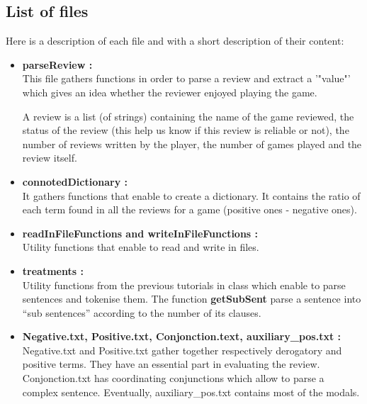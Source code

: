 \documentclass[paper=a4,fontsize=12pt]{report}
\begin{document}
\subsection{List of files}
	Here is a description of each file and with a short description of their content:
\begin{itemize}
	\item \textbf{parseReview :} \\
This file gathers functions in order to parse a review and extract a '"value"' which gives an idea whether the reviewer enjoyed playing the game.

A review is a list (of strings) containing  the name of the game reviewed, the status of the review (this help us know if this review is reliable or not), the number of reviews written by the player, the number of games played and the review itself. 

	\item \textbf{connotedDictionary :} \\
It gathers functions that enable to create a dictionary. It contains the ratio of each term found in all the reviews for a game (positive ones - negative ones). \\ 
	\item \textbf{readInFileFunctions and writeInFileFunctions :} \\
Utility functions that enable to read and write in files. 

	\item \textbf{treatments :} \\  
Utility functions from the previous tutorials in class which enable to parse sentences and tokenise them. The function \textbf{getSubSent} parse a sentence into "`sub sentences"' according to the number of its clauses.

	\item \textbf{Negative.txt, Positive.txt, Conjonction.text, auxiliary\_pos.txt :} \\
Negative.txt and Positive.txt gather together respectively derogatory and positive terms. They have an essential part in evaluating the review. Conjonction.txt has coordinating conjunctions which allow to parse a complex sentence. Eventually, auxiliary\_pos.txt contains most of the modals.\\
\end{itemize}
\end{document}
